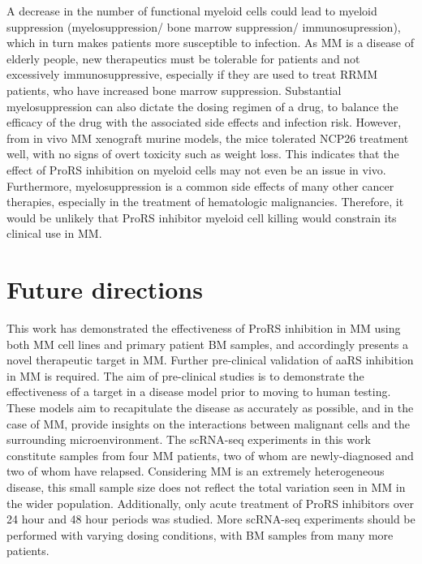 A decrease in the number of functional myeloid cells could lead to myeloid suppression (myelosuppression/ bone marrow suppression/ immunosupression), which in turn makes patients more susceptible to infection.
As MM is a disease of elderly people, new therapeutics must be tolerable for patients and not excessively immunosuppressive, especially if they are used to treat RRMM patients, who have increased bone marrow suppression.
Substantial myelosuppression can also dictate the dosing regimen of a drug, to balance the efficacy of the drug with the associated side effects and infection risk.
However, from in vivo MM xenograft murine models\cite{bottpreclinical2022}, the mice tolerated NCP26 treatment well, with no signs of overt toxicity such as weight loss.
This indicates that the effect of ProRS inhibition on myeloid cells may not even be an issue in vivo.
Furthermore, myelosuppression is a common side effects of many other cancer therapies, especially in the treatment of hematologic malignancies.
Therefore, it would be unlikely that ProRS inhibitor myeloid cell killing would constrain its clinical use in MM\@.

\section{Future directions}
This work has demonstrated the effectiveness of ProRS inhibition in MM using both MM cell lines and primary patient BM samples, and accordingly presents a novel therapeutic target in MM\@.
Further pre-clinical validation of aaRS inhibition in MM is required.
The aim of pre-clinical studies is to demonstrate the effectiveness of a target in a disease model prior to moving to human testing.
These models aim to recapitulate the disease as accurately as possible, and in the case of MM, provide insights on the interactions between malignant cells and the surrounding microenvironment.
The scRNA-seq experiments in this work constitute samples from four MM patients, two of whom are newly-diagnosed and two of whom have relapsed.
Considering MM is an extremely heterogeneous disease, this small sample size does not reflect the total variation seen in MM in the wider population.
Additionally, only acute treatment of ProRS inhibitors over 24 hour and 48 hour periods was studied.
More scRNA-seq experiments should be performed with varying dosing conditions, with BM samples from many more patients.

